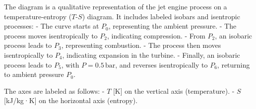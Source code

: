 The diagram is a qualitative representation of the jet engine process on a temperature-entropy (\( T \)-\( S \)) diagram. It includes labeled isobars and isentropic processes:  
- The curve starts at \( P_0 \), representing the ambient pressure.  
- The process moves isentropically to \( P_2 \), indicating compression.  
- From \( P_2 \), an isobaric process leads to \( P_3 \), representing combustion.  
- The process then moves isentropically to \( P_4 \), indicating expansion in the turbine.  
- Finally, an isobaric process leads to \( P_5 \), with \( P = 0.5 \, \text{bar} \), and reverses isentropically to \( P_6 \), returning to ambient pressure \( P_0 \).  

The axes are labeled as follows:  
- \( T \) [K] on the vertical axis (temperature).  
- \( S \) [kJ/kg·K] on the horizontal axis (entropy).